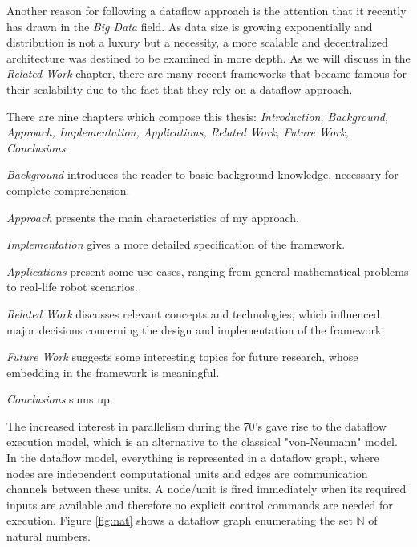 \documentclass{dithesis}
\begin{document}

Another reason for following a dataflow approach is the attention that it recently has drawn in the \textit{Big Data} field. As data size is growing exponentially and distribution is not a luxury but a necessity, a more scalable and decentralized architecture was destined to be examined in more depth. As we will discuss in the \textit{Related Work} chapter, there are many recent frameworks that became famous for their scalability due to the fact that they rely on a dataflow approach.


There are nine chapters which compose this thesis: \textit{Introduction, Background, Approach, Implementation, Applications, Related Work, Future Work, Conclusions}.

\textit{Background} introduces the reader to basic background knowledge, necessary for complete comprehension.

\textit{Approach} presents the main characteristics of my approach.

\textit{Implementation} gives a more detailed specification of the framework.

\textit{Applications} present some use-cases, ranging from general mathematical problems to real-life robot scenarios.

\textit{Related Work} discusses relevant concepts and technologies, which influenced major decisions concerning the design and implementation of the framework.

\textit{Future Work} suggests some interesting topics for future research, whose embedding in the framework is meaningful.

\textit{Conclusions} sums up.


The increased interest in parallelism during the 70's gave rise to the dataflow execution model, which is an alternative to the classical "von-Neumann" model. In the dataflow model, everything is represented in a dataflow graph, where nodes are independent computational units  and edges are communication channels between these units. A node/unit is fired immediately when its required inputs are available and therefore no explicit control commands are needed for execution. Figure \ref{fig:nat} shows a dataflow graph enumerating the set $\mathbb{N}$ of natural numbers.
\end{document}
